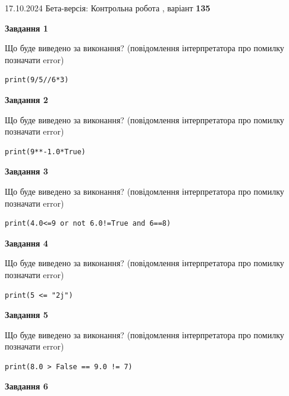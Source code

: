 \documentclass[12pt, ukrainian]{article}
\begin{document}
{\Large{17.10.2024 Бета-версія: Контрольна робота , варіант  \No \textbf { 135 }\par}}
{
\begin {large}
{\begin {center}\textbf{Завдання 1}\end {center}}

Що буде виведено за виконання? (повідомлення інтерпретатора про помилку позначати error)\par
\begin{verbatim}
print(9/5//6*3)
\end{verbatim}

{\begin {center}\textbf{Завдання 2}\end {center}}

Що буде виведено за виконання? (повідомлення інтерпретатора про помилку позначати error)\par
\begin{verbatim}
print(9**-1.0*True)
\end{verbatim}

{\begin {center}\textbf{Завдання 3}\end {center}}

Що буде виведено за виконання? (повідомлення інтерпретатора про помилку позначати error)\par
\begin{verbatim}
print(4.0<=9 or not 6.0!=True and 6==8)
\end{verbatim}

{\begin {center}\textbf{Завдання 4}\end {center}}

Що буде виведено за виконання? (повідомлення інтерпретатора про помилку позначати error)\par
\begin{verbatim}
print(5 <= "2j")
\end{verbatim}

{\begin {center}\textbf{Завдання 5}\end {center}}

Що буде виведено за виконання? (повідомлення інтерпретатора про помилку позначати error)\par
\begin{verbatim}
print(8.0 > False == 9.0 != 7)
\end{verbatim}

{\begin {center}\textbf{Завдання 6}\end {center}}


\end{large}}
\end{document}
